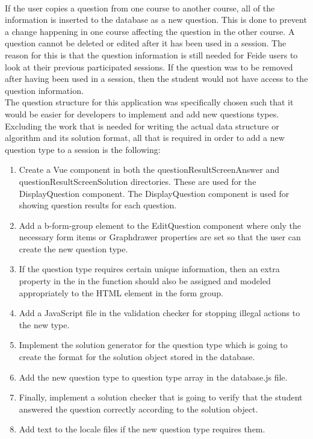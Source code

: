 \\[11pt]
If the user copies a question from one course to another course, all of the information is inserted to the database as a new question. This is done to prevent a change happening in one course affecting the question in the other course. A question cannot be deleted or edited after it has been used in a session. The reason for this is that the question information is still needed for Feide users to look at their previous participated sessions. If the question was to be removed after having been used in a session, then the student would not have access to the question information.
\\[11pt]
The question structure for this application was specifically chosen such that it would be easier for developers to implement and add new questions types. Excluding the work that is needed for writing the actual data structure or algorithm and its solution format, all that is required in order to add a new question type to a session is the following:
\begin{enumerate}
    \item Create a Vue component in both the questionResultScreenAnswer and questionResultScreenSolution directories. These are used for the DisplayQuestion component. The DisplayQuestion component is used for showing question results for each question.
    \item Add a b-form-group element to the EditQuestion component where only the necessary form items or Graphdrawer properties are set so that the user can create the new question type.
    \item If the question type requires certain unique information, then an extra property in the  in the  function should also be assigned and modeled appropriately to the HTML element in the form group.
    \item Add a JavaScript file in the validation checker for stopping illegal actions to the new type. 
    \item Implement the solution generator for the question type which is going to create the format for the solution object stored in the database.
    \item Add the new question type to question type array in the database.js file.
    \item Finally, implement a solution checker that is going to verify that the student answered the question correctly according to the solution object. 
    \item Add text to the locale files if the new question type requires them.
\end{enumerate}
